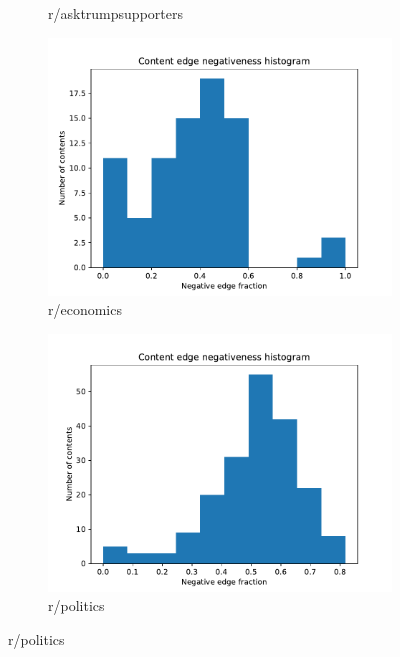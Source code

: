 \documentclass{beamer}
\begin{document}
\begin{frame}[c]
\begin{figure}
\begin{center}
\begin{subfigure}[b]{0.4\textwidth}
				\caption{r/asktrumpsupporters}
				\label{fig:out/covid19200/neg-fraction-content-hist.pdf}
			\end{subfigure}
			\begin{subfigure}[b]{0.4\textwidth}
				\centering
				\includegraphics[width=\textwidth]{out/economics200/neg-fraction-content-hist.pdf}
				\caption{r/economics}
				\label{fig:out/bbcscience200/neg-fraction-content-hist.pdf}
			\end{subfigure}
			\begin{subfigure}[b]{0.4\textwidth}
				\centering
				\includegraphics[width=\textwidth]{out/politics200/neg-fraction-content-hist.pdf}
				\caption{r/politics}
				\label{fig:out/bbctech200/neg-fraction-content-hist.pdf}
			\end{subfigure}
		\end{center}
	\end{figure}

\end{frame}
\end{document}
